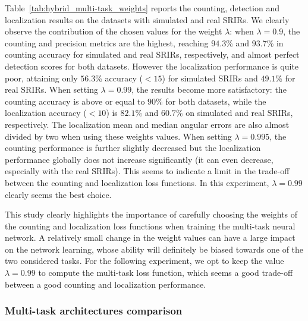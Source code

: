 Table~\ref{tab:hybrid_multi-task_weights} reports the counting, detection and localization results on the datasets with simulated and real SRIRs. We clearly observe the contribution of the chosen values for the weight $\lambda$: when $\lambda=0.9$, the counting and precision metrics are the highest, reaching $94.3$\% and $93.7$\% in counting accuracy for simulated and real SRIRs, respectively, and almost perfect detection scores for both datasets. However the localization performance is quite poor, attaining only $56.3$\% accuracy ($<15$\textdegree) for simulated SRIRs and $49.1$\% for real SRIRs. When setting $\lambda=0.99$, the results become more satisfactory: the counting accuracy is above or equal to $90$\% for both datasets, while the localization accuracy ($<10$\textdegree) is $82.1$\% and $60.7$\% on simulated and real SRIRs, respectively. The localization mean and median angular errors are also almost divided by two when using these weights values. When setting $\lambda=0.995$, the counting performance is further slightly decreased but the localization performance globally does not increase significantly (it can even decrease, especially with the real SRIRs). This seems to indicate a limit in the trade-off between the counting and localization loss functions. In this experiment, $\lambda=0.99$ clearly seems the best choice. 

This study clearly highlights the importance of carefully choosing the weights of the counting and localization loss functions when training the multi-task neural network. A relatively small change in the weight values can have a large impact on the network learning, whose ability will definitely be biased towards one of the two considered tasks. For the following experiment, we opt to keep the value $\lambda=0.99$ to compute the multi-task loss function, which seems a good trade-off between a good counting and localization performance.

\subsubsection{Multi-task architectures comparison}

